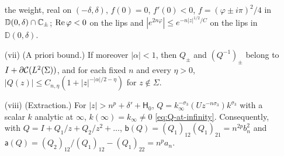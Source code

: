 \begin{proposition}
\begin{enumerate}
  the weight, real on $(-\delta,\delta)$, $f(0)=0$, $f'(0)<0$, $f=(\varphi\pm i\pi)^2/4$ in $\mathbb D(0,\delta)\cap\C_\pm$;
  $\re\varphi<0$ on the lips and $|e^{2n\varphi}|\le e^{-n|z|^{1/2}/C}$ on the lips in $\mathbb D(0,\delta)$.
\item[(vii)] (A priori bound.) If moreover $|\alpha|<1$, then $Q_\pm$ and $(Q^{-1})_\pm$ belong to
  $I+\partial\mathcal{C}(L^2(\Sigma))$, and for each fixed $n$ and every $\eta>0$, $|Q(z)|\le C_{n,\eta}(1+|z|^{-|\alpha|/2-\eta})$ for
  $z\notin\Sigma$.
\item[(viii)] (Extraction.) For $|z|>n^p+\delta'+\mathsf H_0$, $Q=k_\infty^{-\sigma_3}(Uz^{-n\sigma_3})k^{\sigma_3}$ with a
  scalar $k$ analytic at $\infty$, $k(\infty)=k_\infty\ne0$ \eqref{eq:Q-at-infinity}. Consequently, with
  $Q=I+Q_1/z+Q_2/z^2+\dots$, $\mathsf b(Q)=(Q_1)_{12}(Q_1)_{21}=n^{2p}b_n^2$ and
  $\mathsf a(Q)=(Q_2)_{12}/(Q_1)_{12}-(Q_1)_{22}=n^pa_n$.
\end{enumerate}
\end{proposition}

